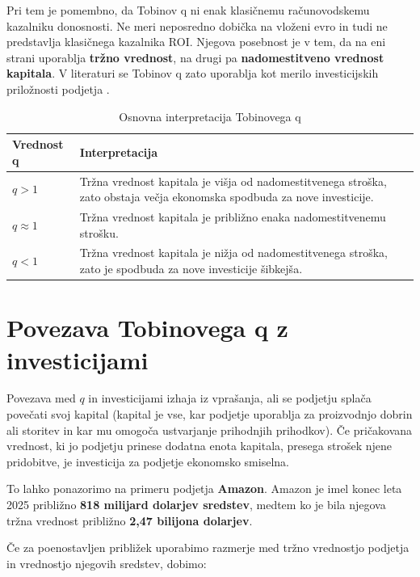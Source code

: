 \documentclass[12pt,a4paper]{article}
\begin{document}
Pri tem je pomembno, da Tobinov q ni enak klasičnemu računovodskemu kazalniku donosnosti. Ne meri neposredno dobička na vloženi evro in tudi ne predstavlja klasičnega kazalnika ROI. Njegova posebnost je v tem, da na eni strani uporablja \textbf{tržno vrednost}, na drugi pa \textbf{nadomestitveno vrednost kapitala}. V literaturi se Tobinov q zato uporablja kot merilo investicijskih priložnosti podjetja \citep{PetersTaylor2016}.

\begin{table}[htbp]
\centering
\caption{Osnovna interpretacija Tobinovega q}
\label{tab:interpretacija_q}
\begin{tabular}{p{3cm}p{10cm}}
\toprule
\textbf{Vrednost q} & \textbf{Interpretacija} \\
\midrule
$q>1$ &
Tržna vrednost kapitala je višja od nadomestitvenega stroška, zato obstaja večja ekonomska spodbuda za nove investicije. \\

$q\approx1$ &
Tržna vrednost kapitala je približno enaka nadomestitvenemu strošku. \\

$q<1$ &
Tržna vrednost kapitala je nižja od nadomestitvenega stroška, zato je spodbuda za nove investicije šibkejša. \\
\bottomrule
\end{tabular}
\end{table}


\section{Povezava Tobinovega q z investicijami}

Povezava med $q$ in investicijami izhaja iz vprašanja, ali se podjetju splača povečati svoj kapital (kapital je vse, kar podjetje uporablja za proizvodnjo dobrin ali storitev in kar mu omogoča ustvarjanje prihodnjih prihodkov). Če pričakovana vrednost, ki jo podjetju prinese dodatna enota kapitala, presega strošek njene pridobitve, je investicija za podjetje ekonomsko smiselna.

To lahko ponazorimo na primeru podjetja \textbf{Amazon}. Amazon je imel konec leta 2025 približno \textbf{818 milijard dolarjev sredstev}, medtem ko je bila njegova tržna vrednost približno \textbf{2,47 bilijona dolarjev}.

Če za poenostavljen približek uporabimo razmerje med tržno vrednostjo podjetja in vrednostjo njegovih sredstev, dobimo:
\end{document}

